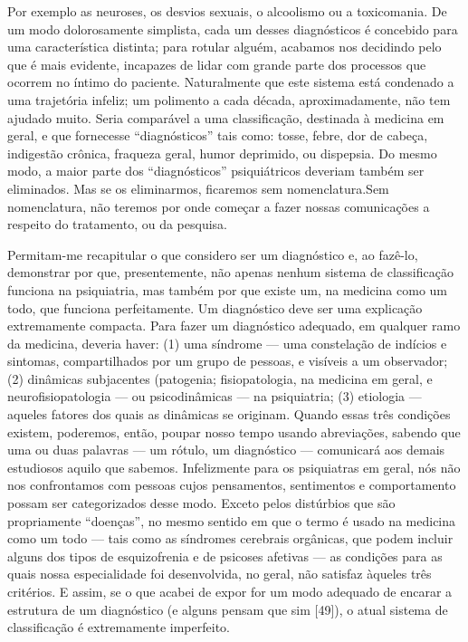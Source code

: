 Por exemplo as neuroses, os desvios sexuais, o alcoolismo ou a
toxicomania. De um modo dolorosamente simplista, cada um desses
diagnósticos é concebido para uma característica distinta; para rotular
alguém, acabamos nos decidindo pelo que é mais evidente, incapazes de
lidar com grande parte dos processos que ocorrem no íntimo do paciente.
Naturalmente que este sistema está condenado a uma trajetória infeliz;
um polimento a cada década, aproximadamente, não tem ajudado muito.
Seria comparável a uma classificação, destinada à medicina em geral, e
que fornecesse ``diagnósticos'' tais como:
tosse, febre, dor de cabeça, indigestão crônica, fraqueza geral, humor
deprimido, ou dispepsia. Do mesmo modo, a maior parte dos
``diagnósticos'' psiquiátricos deveriam
também ser eliminados. Mas se os eliminarmos, ficaremos sem
nomenclatura.\idxnomen[|(] Sem nomenclatura, não teremos por onde começar a fazer
nossas comunicações a respeito do tratamento, ou da pesquisa.

Permitam-me recapitular o que considero ser um diagnóstico e, ao
fazê-lo, demonstrar por que, presentemente, não apenas nenhum sistema
de classificação funciona na psiquiatria, mas também por que existe um,
na medicina como um todo, que funciona perfeitamente. Um diagnóstico
deve ser uma explicação extremamente compacta. Para fazer um
diagnóstico adequado, em qualquer ramo da medicina, deveria haver: (1)
uma síndrome\idxdiagsind{} --- uma constelação de indícios e sintomas,
compartilhados por um grupo de pessoas, e visíveis a um observador; (2)
dinâmicas subjacentes (patogenia;\idxdiagpato{} fisiopatologia, na medicina em geral,
e neurofisiopatologia --- ou psicodinâmicas --- na psiquiatria; (3)
etiologia\idxdiagetio{} --- aqueles fatores dos quais as dinâmicas se originam.
Quando essas três condições existem, poderemos, então, poupar nosso
tempo usando abreviações, sabendo que uma ou duas palavras --- um
rótulo, um diagnóstico --- comunicará aos demais estudiosos aquilo que
sabemos. Infelizmente para os psiquiatras em geral, nós não nos
confrontamos com pessoas cujos pensamentos, sentimentos e comportamento
possam ser categorizados desse modo. Exceto pelos distúrbios que são
propriamente ``doenças'', no mesmo sentido em
que o termo é usado na medicina como um todo --- tais como as
síndromes cerebrais orgânicas,\idxcerea{} que podem incluir alguns dos tipos de
esquizofrenia\idxesquiz{} e de psicoses\idxpsico{} afetivas --- as condições para as quais
nossa especialidade foi desenvolvida, no geral, não satisfaz àqueles
três critérios. E assim, se o que acabei de expor for um modo adequado
de encarar a estrutura de um diagnóstico (e alguns pensam que sim
[49]), o atual sistema de classificação é extremamente imperfeito.

